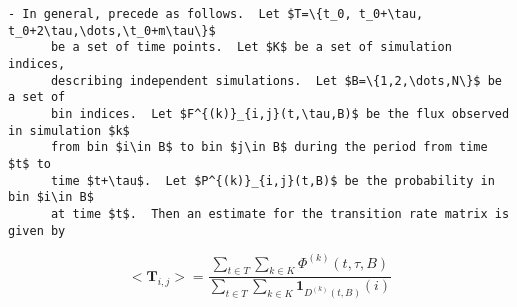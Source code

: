 \documentclass[10pt]{article}
\newcommand{\matr}[1]{\mathbf{#1}}
\begin{document}
\begin{Verbatim}[commandchars=\\\{\},codes={\catcode`$=3\catcode`^=7\catcode`_=8}]
    - In general, precede as follows.  Let $T=\{t_0, t_0+\tau, t_0+2\tau,\dots,\t_0+m\tau\}$ 
      be a set of time points.  Let $K$ be a set of simulation indices,
      describing independent simulations.  Let $B=\{1,2,\dots,N\}$ be a set of
      bin indices.  Let $F^{(k)}_{i,j}(t,\tau,B)$ be the flux observed in simulation $k$
      from bin $i\in B$ to bin $j\in B$ during the period from time $t$ to 
      time $t+\tau$.  Let $P^{(k)}_{i,j}(t,B)$ be the probability in bin $i\in B$
      at time $t$.  Then an estimate for the transition rate matrix is given by

\end{Verbatim}

\[<\matr{T}_{i,j}> = \frac{\sum_{t\in T}\sum_{k\in K} \Phi^{(k)}(t,\tau,B)}{\sum_{t\in T}\sum_{k\in K} \mathbf{1}_{D^{(k)}(t,B)}(i)} \]
              
\begin{Verbatim}[commandchars=\\\{\},codes={\catcode`$=3\catcode`^=7\catcode`_=8}]



\end{Verbatim}
\end{document}
